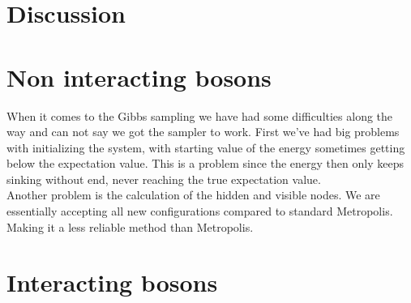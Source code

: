 \section{Discussion}
\section{Non interacting bosons}

When it comes to the Gibbs sampling we have had some difficulties along the way and can not say we got the sampler to work.
First we've had big problems with initializing the system, with starting value of the energy sometimes getting below the expectation value. This is a problem since the energy then only keeps sinking without end, never reaching the true expectation value. \\
Another problem is the calculation of the hidden and visible nodes. We are essentially accepting all new configurations compared to standard Metropolis. Making it a less reliable method than Metropolis. 


\section{Interacting bosons}
